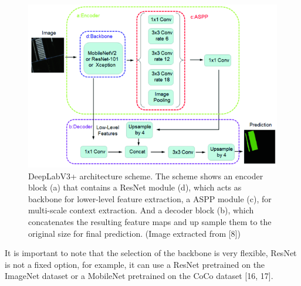 \begin{figure}[H]
 \centering
 \includegraphics[scale=0.8]{IMAGENES/IMG8-deeplab.PNG}
 \captionsetup{font=large}
 \caption {DeepLabV3+ architecture scheme. The scheme shows an encoder block (a) that contains a ResNet module (d), which acts as backbone for lower-level feature extraction, a ASPP module (c), for multi-scale context extraction. And a decoder block (b), which concatenates the resulting feature maps and up sample them to the original size for final prediction. (Image extracted from [8]) }
\end{figure}

It is important to note that the selection of the backbone is very flexible, ResNet is not a fixed option, for example, it can use a ResNet pretrained on the ImageNet dataset or a MobileNet pretrained on the CoCo dataset [16, 17].  